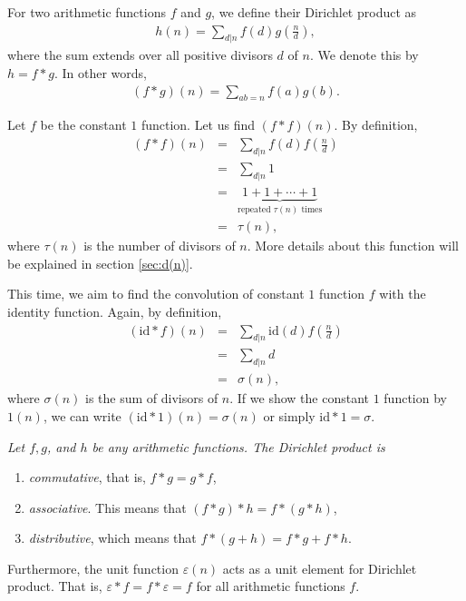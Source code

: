 \documentclass[12pt]{subfile}
\begin{document}
		\begin{definition}
			For two arithmetic functions $f$ and $g$, we define their Dirichlet product as
				\begin{align*}
					h(n)=\sum_{d|n}f(d)g\left(\frac nd\right),
				\end{align*}
			where the sum extends over all positive divisors $d$ of $n$. We denote this by $h=f\ast g$. In other words,
				\begin{align*}
					(f\ast g)(n)=\sum_{ab=n}f(a)g(b).
				\end{align*}
		\end{definition}

		\begin{example}
			Let $f$ be the constant $1$ function. Let us find $(f \ast f)(n)$. By definition,
				\begin{eqnarray*}
					(f \ast f)(n) & = & \sum_{d|n}f(d)f\left(\frac nd\right)\\
								  & = & \sum_{d|n} 1\\
								  & = & \underbrace{1 + 1 + \cdots + 1}_{\text{repeated } \tau(n) \text{ times}}\\
								  & = & \tau(n),
				\end{eqnarray*}
			where $\tau(n)$ is the number of divisors of $n$. More details about this function will be explained in section \ref{sec:d(n)}.
		\end{example}

		\begin{example}
			This time, we aim to find the convolution of constant $1$ function $f$ with the identity function. Again, by definition,
				\begin{eqnarray*}
					(\text{id} \ast f )(n) &=& \sum_{d|n}\text{id}(d)f\left(\frac nd\right)\\
									       &=& \sum_{d|n} d\\
										   &=& \sigma(n),
					\end{eqnarray*}
			where $\sigma(n)$ is the sum of divisors of $n$. If we show the constant $1$ function by $1(n)$, we can write $(\text{id} \ast 1)(n)=\sigma(n)$ or simply $\text{id} \ast 1 = \sigma$.
		\end{example}

		\begin{proposition}\slshape \label{prop:convolutionproperties}
			Let $f, g$, and $h$ be any arithmetic functions. The Dirichlet product is
			\begin{enumerate}
				\item \textit{commutative}, that is, $f\ast g = g \ast f$,
				\item \textit{associative}. This means that $(f \ast g) \ast h = f\ast (g\ast h)$,
				\item \textit{distributive}, which means that $f\ast (g+h) = f\ast g+ f\ast h$.
			\end{enumerate}
			Furthermore, the unit function $\varepsilon(n)$ acts as a unit element for Dirichlet product. That is, $\varepsilon\ast f = f \ast \varepsilon = f$ for all arithmetic functions $f$.
		\end{proposition}
\end{document}
